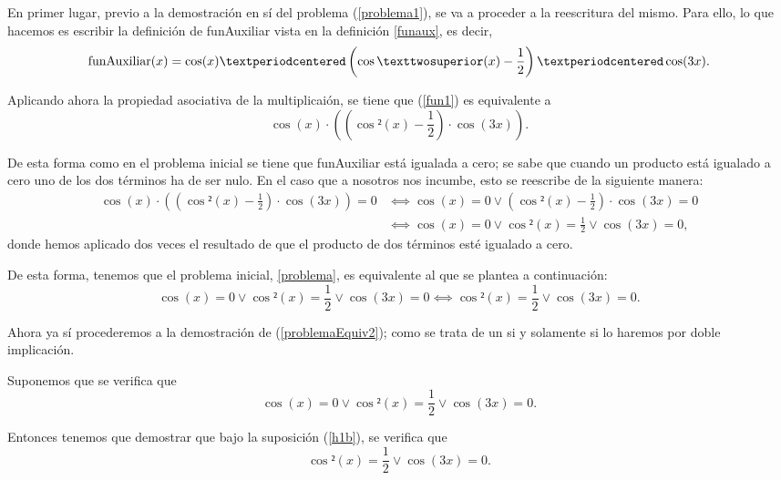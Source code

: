 \begin{demostracion}
  En primer lugar, previo a la demostración en sí del problema
  (\ref{problema1}), se va a proceder a la reescritura del mismo.
  Para ello, lo que hacemos es escribir la definición de
  funAuxiliar vista en la definición \ref{funaux}, es decir,
  \begin{equation}\label{fun1}
    \funauxiliar(x) = \cos(x)·\left(\cos²(x)-\frac{1}{2}\right)·\cos(3x).
  \end{equation}

  Aplicando ahora la propiedad asociativa de la multiplicaión,
  se tiene que (\ref{fun1}) es equivalente a
  \begin{equation}\label{fun2}
    \cos(x)·\left(\left(\cos²(x)-\frac{1}{2}\right)·\cos(3x)\right).
  \end{equation}

  De esta forma como en el problema inicial se tiene que funAuxiliar
  está igualada a cero; se sabe que cuando un producto está igualado
  a cero uno de los dos términos ha de ser nulo. En el caso que a
  nosotros nos incumbe, esto se reescribe de la siguiente manera:
  \begin{align}
    \cos(x)·\left(\left(\cos²(x)-\frac{1}{2}\right)·\cos(3x)\right)=0
    &⟺ \cos(x) = 0 ∨ \left(\cos²(x)-\frac{1}{2}\right)·\cos(3x)=0 \\
    &⟺ \cos(x) = 0 ∨ \cos²(x)=\frac{1}{2} ∨ \cos(3x)=0,
  \end{align}
  donde hemos aplicado dos veces el resultado de que el producto
  de dos términos esté igualado a cero.

  De esta forma, tenemos que el problema inicial, \ref{problema},
  es equivalente al que se plantea a continuación:
  \begin{equation}\label{problemaEquiv2}
    \cos(x)=0 \lor \cos²(x)=\frac{1}{2} \lor \cos(3x)=0
    ⟺ \cos²(x)=\frac{1}{2} \lor \cos(3x)=0.
  \end{equation}

  Ahora ya sí procederemos a la demostración de
  (\ref{problemaEquiv2}); como se trata de un si y solamente si
  lo haremos por doble implicación.

  \noindent
  \framebox{\longrightarrow} Suponemos que se verifica que
  \begin{equation}\label{Casosh1}\tag{h1}
    \cos(x)=0 \lor \cos²(x)=\frac{1}{2} \lor \cos(3x)=0.
  \end{equation}

  Entonces tenemos que demostrar que bajo la suposición (\ref{h1b}),
  se verifica que
  \begin{equation}\label{CasosConc1}
     \cos²(x)=\frac{1}{2} \lor \cos(3x)=0.
  \end{equation}


\end{demostracion}
